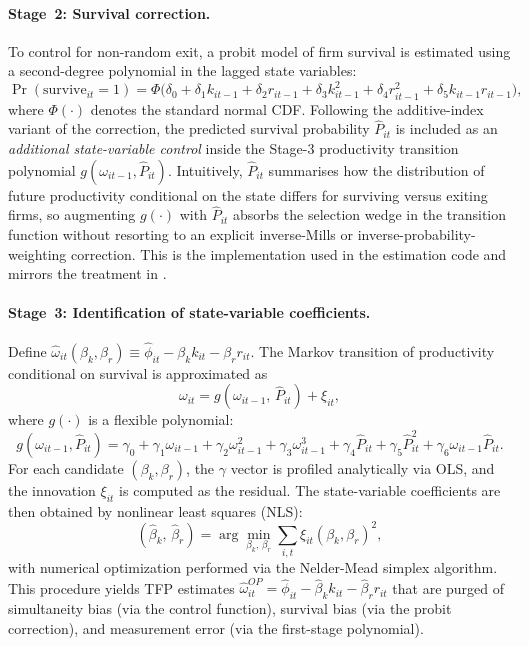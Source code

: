 \documentclass[a4paper, 12pt]{article}
\begin{document}
\paragraph{Stage~2: Survival correction.}
To control for non-random exit, a probit model of firm survival is estimated using a second-degree polynomial in the lagged state variables:
\begin{equation}
  \Pr(\text{survive}_{it} = 1)
    = \Phi\!\bigl(\delta_0 + \delta_1 k_{it-1} + \delta_2 r_{it-1}
      + \delta_3 k_{it-1}^2 + \delta_4 r_{it-1}^2
      + \delta_5 k_{it-1} r_{it-1}\bigr),
  \label{eq:op_probit}
\end{equation}
where $\Phi(\cdot)$ denotes the standard normal CDF. Following the additive-index variant of the \textcite{olley1992dynamics} correction, the predicted survival probability $\hat{P}_{it}$ is included as an \emph{additional state-variable control} inside the Stage-3 productivity transition polynomial $g(\omega_{it-1}, \hat{P}_{it})$. Intuitively, $\hat{P}_{it}$ summarises how the distribution of future productivity conditional on the state differs for surviving versus exiting firms, so augmenting $g(\cdot)$ with $\hat{P}_{it}$ absorbs the selection wedge in the transition function without resorting to an explicit inverse-Mills or inverse-probability-weighting correction. This is the implementation used in the estimation code and mirrors the treatment in \textcite{olley1992dynamics}.

\paragraph{Stage~3: Identification of state-variable coefficients.}
Define $\hat\omega_{it}(\beta_k, \beta_r) \equiv \hat\phi_{it} - \beta_k k_{it} - \beta_r r_{it}$. The Markov transition of productivity conditional on survival is approximated as
\begin{equation}
  \omega_{it} = g(\omega_{it-1},\, \hat{P}_{it}) + \xi_{it},
  \label{eq:op_transition}
\end{equation}
where $g(\cdot)$ is a flexible polynomial:
\begin{equation}
  g(\omega_{it-1}, \hat{P}_{it})
    = \gamma_0 + \gamma_1 \omega_{it-1} + \gamma_2 \omega_{it-1}^2
      + \gamma_3 \omega_{it-1}^3 + \gamma_4 \hat{P}_{it}
      + \gamma_5 \hat{P}_{it}^2 + \gamma_6 \omega_{it-1} \hat{P}_{it}.
\end{equation}
For each candidate $(\beta_k, \beta_r)$, the $\gamma$ vector is profiled analytically via OLS, and the innovation $\xi_{it}$ is computed as the residual. The state-variable coefficients are then obtained by nonlinear least squares (NLS):
\begin{equation}
  (\hat\beta_k,\, \hat\beta_r)
    = \arg\min_{\beta_k,\, \beta_r}
      \sum_{i,t} \xi_{it}(\beta_k, \beta_r)^2,
  \label{eq:op_nls}
\end{equation}
with numerical optimization performed via the Nelder-Mead simplex algorithm. This procedure yields TFP estimates $\hat\omega_{it}^{OP} = \hat\phi_{it} - \hat\beta_k k_{it} - \hat\beta_r r_{it}$ that are purged of simultaneity bias (via the control function), survival bias (via the probit correction), and measurement error (via the first-stage polynomial).
\end{document}
